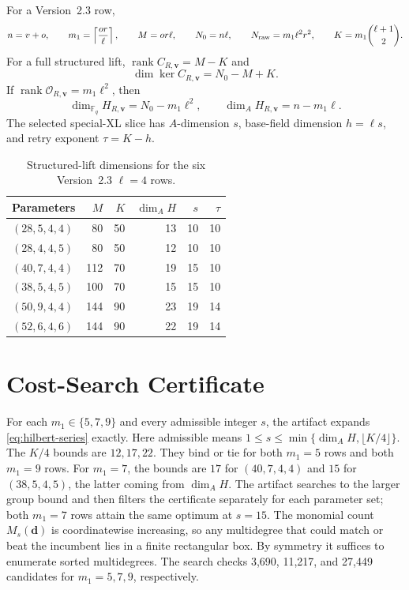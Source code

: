 \documentclass[11pt]{article}
\newcommand{\F}{\mathbb F}
\newcommand{\rank}{\operatorname{rank}}
\begin{document}
For a Version~2.3 row,
\[
 n=v+o,
 \qquad m_1=\left\lceil\frac{or}{\ell}\right\rceil,
 \qquad M=or\ell,
 \qquad N_0=n\ell,
 \qquad N_{\rm raw}=m_1\ell^2r^2,
 \qquad K=m_1\binom{\ell+1}{2}.
\]
For a full structured lift, $\rank C_{R,\mathbf v}=M-K$ and
\[
 \dim\ker C_{R,\mathbf v}=N_0-M+K.
\]
If $\rank\mathcal O_{R,\mathbf v}=m_1\ell^2$, then
\[
 \dim_{\F_q}H_{R,\mathbf v}=N_0-m_1\ell^2,
 \qquad
 \dim_A H_{R,\mathbf v}=n-m_1\ell.
\]
The selected special-XL slice has $A$-dimension $s$, base-field dimension
$h=\ell s$, and retry exponent $\tau=K-h$.

\begin{table}[tbp]
\centering
\caption{Structured-lift dimensions for the six Version~2.3 $\ell=4$ rows.}
\label{tab:dimensions}
\small
\setlength{\tabcolsep}{5pt}
\begin{tabular}{@{}l r r r r r@{}}
\toprule
Parameters & $M$ & $K$ & $\dim_A H$ & $s$ & $\tau$\\
\midrule
$(28,5,4,4)$ & 80  & 50 & 13 & 10 & 10\\
$(28,4,4,5)$ & 80  & 50 & 12 & 10 & 10\\
$(40,7,4,4)$ & 112 & 70 & 19 & 15 & 10\\
$(38,5,4,5)$ & 100 & 70 & 15 & 15 & 10\\
$(50,9,4,4)$ & 144 & 90 & 23 & 19 & 14\\
$(52,6,4,6)$ & 144 & 90 & 22 & 19 & 14\\
\bottomrule
\end{tabular}
\end{table}

\section{Cost-Search Certificate}\label{app:cost-certificates}

For each $m_1\in\{5,7,9\}$ and every admissible integer $s$, the artifact
expands \eqref{eq:hilbert-series} exactly.  Here admissible means
$1\le s\le\min\{\dim_A H,\lfloor K/4\rfloor\}$.  The $K/4$ bounds are
$12,17,22$.  They bind or tie for both $m_1=5$ rows and both $m_1=9$ rows.
For $m_1=7$, the bounds are $17$ for $(40,7,4,4)$ and $15$ for
$(38,5,4,5)$, the latter coming from $\dim_A H$.  The artifact searches to
the larger group bound and then filters the certificate separately for each
parameter set; both $m_1=7$ rows attain the same optimum at $s=15$.
The monomial count
$M_s(\mathbf d)$ is coordinatewise increasing, so any multidegree that could
match or beat the incumbent lies in a finite rectangular box.  By symmetry it
suffices to enumerate sorted multidegrees.  The search checks 3,690, 11,217,
and 27,449 candidates for $m_1=5,7,9$, respectively.
 
\end{document}
